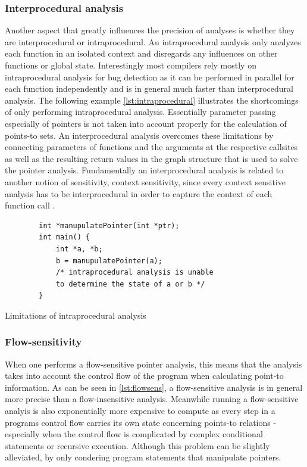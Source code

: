\subsubsection{Interprocedural analysis}
Another aspect that greatly influences the precision of analyses is whether they are interprocedural or intraprocedural.
An intraprocedural analysis only analyzes each function in an isolated context and disregards any influences on other functions or global state.
Interestingly most compilers rely mostly on intraprocedural analysis for bug detection as it can be performed in parallel for each function independently and is in general much faster than interprocedural analysis.
The following example \ref{lst:intraprocedural} illustrates the shortcomings of only performing intraprocedural analysis. Essentially parameter passing especially of pointers is not taken into account properly for the calculation of points-to sets.
An interprocedural analysis overcomes these limitations by connecting parameters of functions and the arguments at the respective callsites as well as the resulting return values in the graph structure that is used to solve the pointer analysis.
Fundamentally an interprocedural analysis is related to another notion of sensitivity, context sensitivity, since every context sensitive analysis has to be interprocedural in order to capture the context of each function call \cite{lin2015alias}.

\begin{listing}
    \begin{verbatim}
        int *manupulatePointer(int *ptr);
        int main() {
            int *a, *b;
            b = manupulatePointer(a);
            /* intraprocedural analysis is unable 
            to determine the state of a or b */
        }
    \end{verbatim}
    \caption{Limitations of intraprocedural analysis}
    \label{lst:intraprocedural}
\end{listing}


\subsubsection{Flow-sensitivity}
When one performs a flow-sensitive pointer analysis, this means that the analysis takes into account the control flow of the program when calculating point-to information.
As can be seen in \ref{lst:flowsens}, a flow-sensitive analysis is in general more precise than a flow-insensitive analysis. Meanwhile running a flow-sensitive analyis is also exponentially more expensive to compute as every step in a programs control flow carries its own state concerning points-to relations - especially when the control flow is complicated by complex conditional statements or recursive execution.
Although this problem can be slightly alleviated, by only condering program statements that manipulate pointers.


